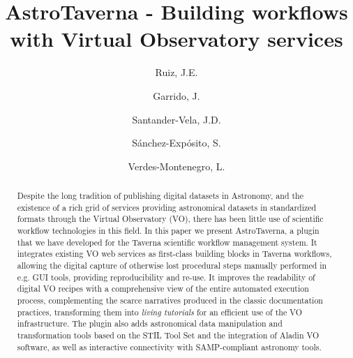 \documentclass[final,authoryear,5p,times,twocolumn]{elsarticle}
\begin{document}
\begin{frontmatter}



\title{AstroTaverna - Building workflows with Virtual Observatory services}


\author[IAA]{Ruiz, J.E.}

\author[IAA]{Garrido, J.}

\author[IAA]{Santander-Vela, J.D.}
\author[IAA]{S\'anchez-Exp\'osito, S.}
\author[IAA]{Verdes-Montenegro, L.}

\address[IAA]{Instituto de Astrof\'isica de Andaluc\'ia - CSIC \\Glorieta de la Astronom\'ia s/n, 18008 Granada, Spain}


\begin{abstract}
Despite the long tradition of publishing digital datasets in Astronomy, and the existence of a rich grid of services providing astronomical datasets in standardized formats through the Virtual Observatory (VO), there has been little use of scientific workflow technologies in this field. In this paper we present AstroTaverna, a plugin that we have developed for the Taverna scientific workflow management system. It integrates existing VO web services as first-class building blocks in Taverna workflows, allowing the digital capture of otherwise lost procedural steps manually performed in e.g. GUI tools, providing reproducibility and re-use. It improves the readability of digital VO recipes with a comprehensive view of the entire automated execution process, complementing the scarce narratives produced in the classic documentation practices, transforming them into \textit{living tutorials} for an efficient use of the VO infrastructure. The plugin also adds astronomical data manipulation and transformation tools based on the STIL Tool Set and the integration of Aladin VO software, as well as interactive connectivity with SAMP-compliant astronomy tools. 
\end{abstract}


\end{frontmatter}
\end{document}
